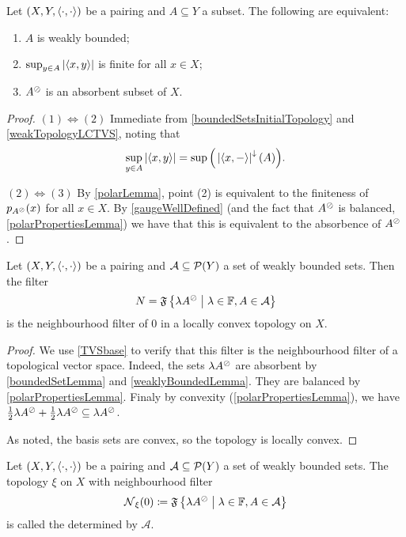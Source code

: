 \begin{lemma} \label{weaklyBoundedLemma}
Let $\left( X,Y,\left\langle \cdot,\cdot \right\rangle \right)$ be a pairing and $A\subseteq Y$ a subset. The following are equivalent:
\begin{enumerate}
\item $A$ is weakly bounded;
\item $\sup_{y\in A}\left|\left\langle x, y \right\rangle\right|$ is finite for all $x\in X$;
\item $A^\oslash$ is an absorbent subset of $X$.
\end{enumerate}
\end{lemma}
\begin{proof}
$(1) \Leftrightarrow (2)$ Immediate from \ref{boundedSetsInitialTopology} and \ref{weakTopologyLCTVS}, noting that
\[ \sup_{y\in A}\left|\left\langle x, y \right\rangle\right| = \sup\Big(\left|\left\langle x,- \right\rangle\right|^{\downarrow}(A)\Big). \]

$(2) \Leftrightarrow (3)$ By \ref{polarLemma}, point (2) is equivalent to the finiteness of $p_{A^\oslash}(x)$ for all $x\in X$. By \ref{gaugeWellDefined} (and the fact that $A^\oslash$ is balanced, \ref{polarPropertiesLemma}) we have that this is equivalent to the absorbence of $A^\oslash$.
\end{proof}

\begin{proposition}
Let $\left( X,Y,\left\langle \cdot,\cdot \right\rangle \right)$ be a pairing and $\mathcal{A}\subseteq\operatorname{\mathcal{P}}(Y)$ a set of weakly bounded sets. Then the filter
\[ N = \mathfrak{F}\left\{ \lambda A^\oslash \;\middle|\; \lambda\in \mathbb{F}, A\in \mathcal{A} \right\} \]
is the neighbourhood filter of $0$ in a locally convex topology on $X$.
\end{proposition}
\begin{proof}
We use \ref{TVSbase} to verify that this filter is the neighbourhood filter of a topological vector space. Indeed, the sets $\lambda A^\oslash$ are absorbent by \ref{boundedSetLemma} and \ref{weaklyBoundedLemma}. They are balanced by \ref{polarPropertiesLemma}. Finaly by convexity (\ref{polarPropertiesLemma}), we have $\frac{1}{2}\lambda A^\oslash + \frac{1}{2} \lambda A^\oslash \subseteq \lambda A^\oslash$.

As noted, the basis sets are convex, so the topology is locally convex.
\end{proof}

\begin{definition}
Let $\left( X,Y,\left\langle \cdot,\cdot \right\rangle \right)$ be a pairing and $\mathcal{A}\subseteq\operatorname{\mathcal{P}}(Y)$ a set of weakly bounded sets. The topology $\xi$ on $X$ with neighbourhood filter
\[ \operatorname{\mathcal{N}}_\xi(0) \coloneqq \mathfrak{F}\left\{ \lambda A^\oslash \;\middle|\; \lambda\in \mathbb{F}, A\in \mathcal{A} \right\} \]
is called the  determined by $\mathcal{A}$.
\end{definition}

